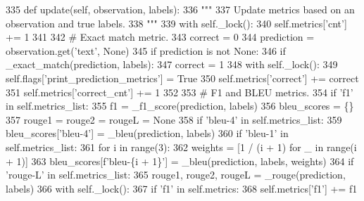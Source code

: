 \begin{DoxyCode}
335     \textcolor{keyword}{def }update(self, observation, labels):
336         \textcolor{stringliteral}{"""}
337 \textcolor{stringliteral}{        Update metrics based on an observation and true labels.}
338 \textcolor{stringliteral}{        """}
339         with self.\_lock():
340             self.metrics[\textcolor{stringliteral}{'cnt'}] += 1
341 
342         \textcolor{comment}{# Exact match metric.}
343         correct = 0
344         prediction = observation.get(\textcolor{stringliteral}{'text'}, \textcolor{keywordtype}{None})
345         \textcolor{keywordflow}{if} prediction \textcolor{keywordflow}{is} \textcolor{keywordflow}{not} \textcolor{keywordtype}{None}:
346             \textcolor{keywordflow}{if} \_exact\_match(prediction, labels):
347                 correct = 1
348             with self.\_lock():
349                 self.flags[\textcolor{stringliteral}{'print\_prediction\_metrics'}] = \textcolor{keyword}{True}
350                 self.metrics[\textcolor{stringliteral}{'correct'}] += correct
351                 self.metrics[\textcolor{stringliteral}{'correct\_cnt'}] += 1
352 
353             \textcolor{comment}{# F1 and BLEU metrics.}
354             \textcolor{keywordflow}{if} \textcolor{stringliteral}{'f1'} \textcolor{keywordflow}{in} self.metrics\_list:
355                 f1 = \_f1\_score(prediction, labels)
356             bleu\_scores = \{\}
357             rouge1 = rouge2 = rougeL = \textcolor{keywordtype}{None}
358             \textcolor{keywordflow}{if} \textcolor{stringliteral}{'bleu-4'} \textcolor{keywordflow}{in} self.metrics\_list:
359                 bleu\_scores[\textcolor{stringliteral}{'bleu-4'}] = \_bleu(prediction, labels)
360             \textcolor{keywordflow}{if} \textcolor{stringliteral}{'bleu-1'} \textcolor{keywordflow}{in} self.metrics\_list:
361                 \textcolor{keywordflow}{for} i \textcolor{keywordflow}{in} range(3):
362                     weights = [1 / (i + 1) \textcolor{keywordflow}{for} \_ \textcolor{keywordflow}{in} range(i + 1)]
363                     bleu\_scores[f\textcolor{stringliteral}{'bleu-\{i + 1\}'}] = \_bleu(prediction, labels, weights)
364             \textcolor{keywordflow}{if} \textcolor{stringliteral}{'rouge-L'} \textcolor{keywordflow}{in} self.metrics\_list:
365                 rouge1, rouge2, rougeL = \_rouge(prediction, labels)
366             with self.\_lock():
367                 \textcolor{keywordflow}{if} \textcolor{stringliteral}{'f1'} \textcolor{keywordflow}{in} self.metrics:
368                     self.metrics[\textcolor{stringliteral}{'f1'}] += f1

\end{DoxyCode}
